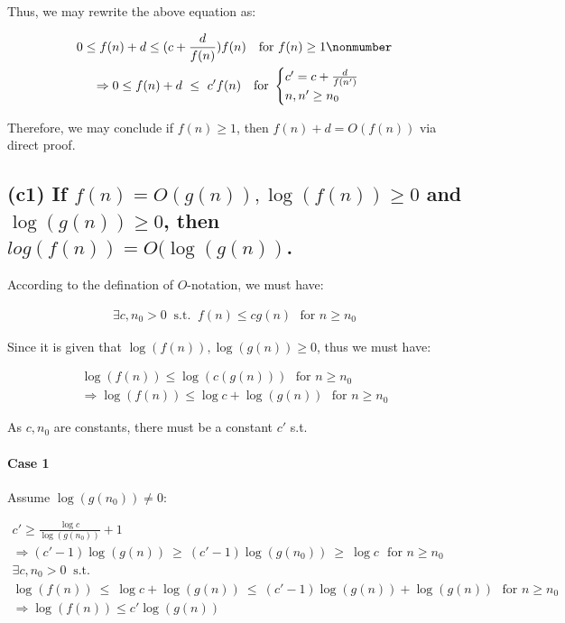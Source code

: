 \documentclass[12pt]{article}
\begin{document}
Thus, we may rewrite the above equation as:


\begin{gather}
 0 \leq f(n)+d \leq (c + \frac{d}{f(n)})f(n) \ \ \ \text{for $f(n) \geq 1$} \nonmumber\\
 \Rightarrow 0 \leq f(n)+d \ \leq \ c'f(n) \ \ \ \text{for } \begin{cases}
                 c' = c + \frac{d}{f(n')} \\
                 n, n' \geq n_{0}
             \end{cases}
\end{gather}

Therefore, we may conclude if $f(n) \geq 1$, then $f(n) + d = O(f(n))$ via direct proof.




\subsection{(c1) If $f(n) = O(g(n)), \log(f(n)) \geq 0$ and $\log(g(n)) \geq 0$, then $log(f(n)) = O(\log(g(n))$.}

According to the defination of $O$-notation, we must have:

\begin{gather}
    \exists c, n_{0} > 0 \ \text{ s.t. } \ f(n) \leq cg(n) \ \ \ \text{for $n \geq n_{0}$}
\end{gather}


Since it is given that $\log(f(n)), \log(g(n)) \geq 0$, thus we must have:

\begin{gather}
    \log(f(n)) \leq \log(c(g(n))) \ \ \ \text{for $n \geq n_{0}$} \nonumber\\
    \Rightarrow \log(f(n)) \leq \log c + \log(g(n)) \ \ \ \text{for $n \geq n_{0}$}
\end{gather}

As $c, n_{0}$ are constants, there must be a constant $c'$ s.t.

\paragraph{Case 1} Assume $\log (g(n_{0})) \neq 0$:

\begin{gather}
    c' \geq \frac{\log c}{\log (g(n_{0}))} + 1 \\
    \Rightarrow (c' -1)\log (g(n))  \ \geq \ (c' -1)\log (g(n_{0})) \ \geq \ \log c \ \ \ \text{for $n \geq n_{0}$} \\
    \exists c, n_{0} > 0 \nonumber \ \text{ s.t. } \  \\
    \log(f(n)) \ \leq \ \log c + \log(g(n)) \ \leq \  (c' -1)\log (g(n)) + \log(g(n))\ \ \ \text{for $n \geq n_{0}$} \\
    \Rightarrow \log(f(n))  \leq c'\log (g(n))
\end{gather}
\end{document}

